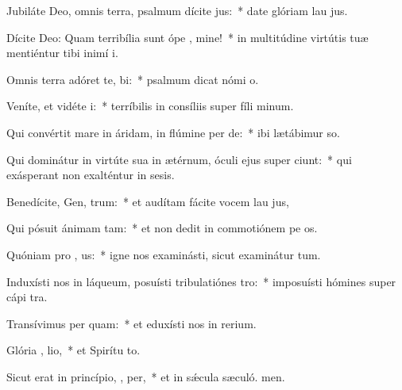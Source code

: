 \item Jubiláte Deo, omnis terra, psalmum dícite  jus:~* date glóriam lau jus.
\item Dícite Deo: Quam terribília sunt ópe , mine!~* in multitúdine virtútis tuæ mentiéntur tibi inimí i.
\item Omnis terra adóret te,   bi:~* psalmum dicat nómi o.
\item Veníte, et vidéte  i:~* terríbilis in consíliis super fíli minum.
\item Qui convértit mare in áridam, in flúmine per de:~* ibi lætábimur  so.
\item Qui dominátur in virtúte sua in ætérnum, óculi ejus super  ciunt:~* qui exásperant non exalténtur in sesis.
\item Benedícite, Gen,  trum:~* et audítam fácite vocem lau jus,
\item Qui pósuit ánimam   tam:~* et non dedit in commotiónem pe os.
\item Quóniam pro , us:~* igne nos examinásti, sicut examinátur tum.
\item Induxísti nos in láqueum, posuísti tribulatiónes   tro:~* imposuísti hómines super cápi tra.
\item Transívimus per   quam:~* et eduxísti nos in rerium.
\item Glória ,  lio,~* et Spirítu to.
\item Sicut erat in princípio,  ,  per,~* et in sǽcula sæculó. men.
